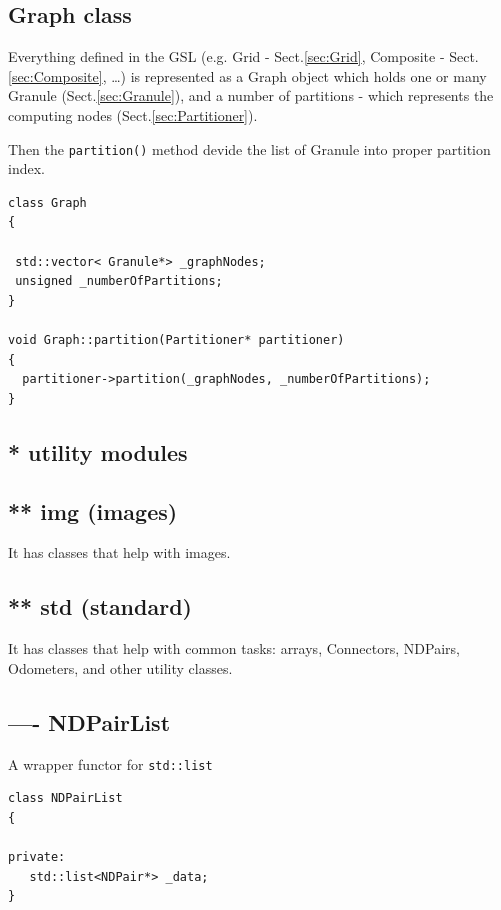 \subsection{Graph class}
\label{sec:Graph-class}

Everything defined in the GSL (e.g. Grid - Sect.\ref{sec:Grid}, Composite -
Sect.\ref{sec:Composite}, \ldots) is represented as a Graph object which holds
one or many Granule (Sect.\ref{sec:Granule}), and a number of partitions
- which represents the computing nodes (Sect.\ref{sec:Partitioner}).

Then the \verb!partition()! method devide the list of Granule into proper
partition index. 
\begin{lstlisting}
class Graph
{

 std::vector< Granule*> _graphNodes;
 unsigned _numberOfPartitions;
}

void Graph::partition(Partitioner* partitioner)
{
  partitioner->partition(_graphNodes, _numberOfPartitions);
}
\end{lstlisting}

\subsection{* utility modules}
\label{sec:GSL-utility}

\subsection{ ** img (images)}
\label{sec:GSL-utility-img}

It has classes that help with images.

\subsection{ ** std (standard)}
\label{sec:GSL-utility-std}

It has classes that help with common tasks:
arrays, Connectors, NDPairs, Odometers, and other utility classes.

\subsection{ ---- NDPairList}
\label{sec:NDPairList}

A wrapper functor for \verb!std::list!

\begin{verbatim}
class NDPairList
{

private:
   std::list<NDPair*> _data;
}
\end{verbatim}

